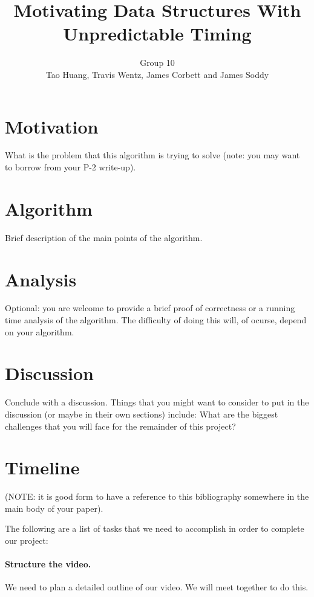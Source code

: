 \documentclass[11pt,twocolumn]{article}
\title{Motivating Data Structures With Unpredictable Timing}
\author{Group 10\\
\small{Tao Huang, Travis Wentz, James Corbett and James Soddy}}
\begin{document}
\maketitle



\section{Motivation}
What is the problem that this algorithm is trying to solve (note: you may want 
to borrow from your P-2 write-up).

\section{Algorithm}
Brief description of the main points of the algorithm.

\section{Analysis}
Optional: you are welcome to provide a brief proof of correctness or a 
running time analysis of the algorithm.  The difficulty of doing this will, of 
ocurse, depend on your algorithm.

\section{Discussion}
Conclude with a discussion.  Things that you might want to consider to put in 
the discussion (or maybe in their own sections) include: What are the biggest 
challenges that you will face for the remainder of this project?  


 

\newpage
\appendix
\section{Timeline}
(NOTE: it is good form to have a reference to this bibliography somewhere in 
the main body of your paper).

The following are a list of tasks that we need to accomplish in order to 
complete our project:

\paragraph{Structure the video.} We need to plan a detailed outline of our 
video.  We will meet together to do this.
\end{document}
